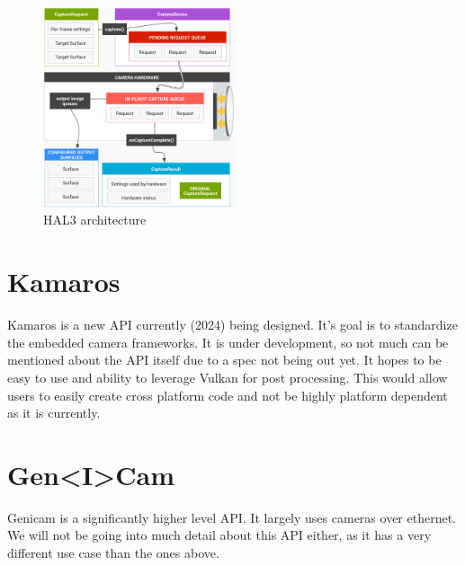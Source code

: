\begin{figure}
    \begin{center}
        \includegraphics[width=0.5\textwidth]{figures/hal3arch}
    \end{center}
    \caption{HAL3 architecture \cite{hal3arch}}\label{fig:hal3arch}
\end{figure}

\section{Kamaros}
Kamaros is a new API currently (2024) being designed. It's goal is to
standardize the embedded camera frameworks. It is under development, so not much
can be mentioned about the API itself due to a spec not being out yet. It hopes
to be easy to use and ability to leverage Vulkan for post processing. This
would allow users to easily create cross platform code and not be highly
platform dependent as it is currently.

\section {Gen<I>Cam}
Genicam is a significantly higher level API. It largely uses cameras over
ethernet. We will not be going into much detail about this API either,
as it has a very different use case than the ones above.
